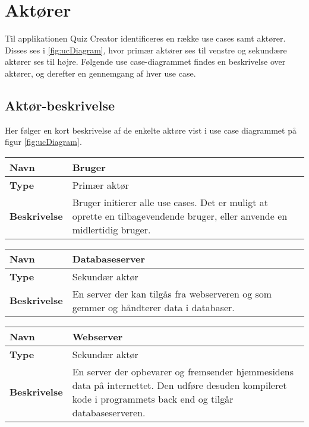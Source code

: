 \section{Aktører}

Til applikationen Quiz Creator identificeres en række use cases samt aktører. Disses ses i \ref{fig:ucDiagram}, hvor primær aktører ses til venstre og sekundære aktører ses til højre. Følgende use case-diagrammet findes en beskrivelse over aktører, og derefter en gennemgang af hver use case. 


\subsection{Aktør-beskrivelse}
Her følger en kort beskrivelse af de enkelte aktøre vist i use case diagrammet på figur \ref{fig:ucDiagram}.

\begin{tabular}{|p{2cm}|p{12cm}|}

\hline 
\textbf{Navn} & Bruger \\ 
\hline 
\textbf{Type} & Primær aktør \\ 
\hline 
\textbf{Beskrivelse} & Bruger initierer alle use cases. Det er muligt at oprette en tilbagevendende bruger, eller anvende en midlertidig bruger.\\ 
\hline 

\end{tabular} 

\begin{tabular}{|p{2cm}|p{12cm}|}

\hline 
\textbf{Navn} & Databaseserver \\ 
\hline 
\textbf{Type} & Sekundær aktør \\ 
\hline 
\textbf{Beskrivelse} & En server der kan tilgås fra webserveren og som gemmer og håndterer data i databaser.\\ 
\hline 

\end{tabular} 

\begin{tabular}{|p{2cm}|p{12cm}|}

\hline 
\textbf{Navn} & Webserver \\ 
\hline 
\textbf{Type} & Sekundær aktør \\ 
\hline 
\textbf{Beskrivelse} & En server der opbevarer og fremsender hjemmesidens data på internettet. Den udføre desuden kompileret kode i programmets back end og tilgår databaseserveren. \\ 
\hline 

\end{tabular} 